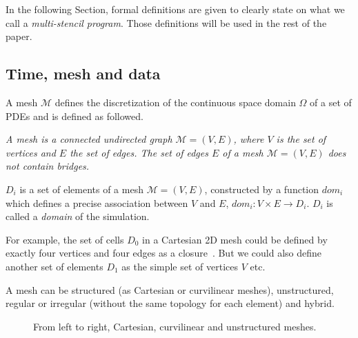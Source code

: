 In the following Section, formal definitions are given to clearly state on what we call a \textit{multi-stencil program}. Those definitions will be used in the rest of the paper.

\subsection{Time, mesh and data}

A mesh $\mathcal{M}$ defines the discretization of the continuous space domain $\Omega$ of a set of PDEs and is defined as followed. 

\begin{mydef}
\textit{A mesh is a connected undirected graph $\mathcal{M}=(V,E)$, where $V$ is the set of vertices and $E$ the set of edges. The set of edges $E$ of a mesh $\mathcal{M}=(V,E)$ does not contain bridges.}
\end{mydef}

\begin{mydef}
$D_i$ is a set of elements of a mesh $\mathcal{M}=(V,E)$, constructed by a function $dom_i$ which defines a precise association between $V$ and $E$, $dom_i : V \times E \rightarrow D_i$. $D_i$ is called a \emph{domain} of the simulation.
\end{mydef}
For example, the set of cells $D_0$ in a Cartesian 2D mesh could be defined by exactly four vertices and four edges as a closure~\cite{}. But we could also define another set of elements $D_1$ as the simple set of vertices $V$ etc.

A mesh can be structured (as Cartesian or curvilinear meshes), unstructured, regular or irregular (without the same topology for each element) and hybrid. 

\begin{figure}[!h]\begin{center}
  \caption{From left to right, Cartesian, curvilinear and unstructured meshes.}
  \label{fig:mesh}
\end{center}\end{figure}

